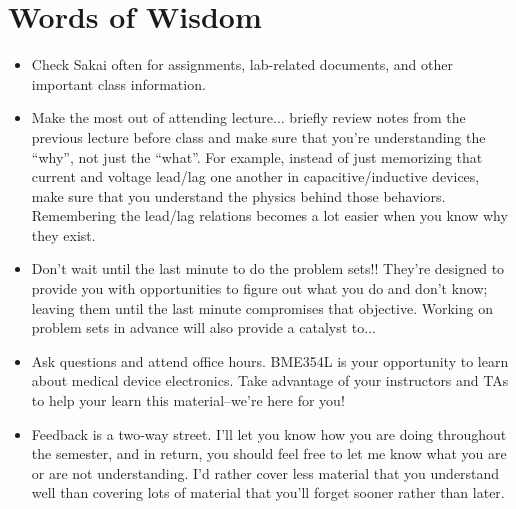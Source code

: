 \section{Words of Wisdom}
\begin{itemize}
    \item Check Sakai often for assignments, lab-related documents, and other
    important class information.
    \item Make the most out of attending lecture... briefly review notes from
    the previous lecture before class and make sure that you're understanding
    the ``why'', not just the ``what''. For example, instead of just memorizing
    that current and voltage lead/lag one another in capacitive/inductive
    devices, make sure that you understand the physics behind those behaviors.
    Remembering the lead/lag relations becomes a lot easier when you know why
    they exist.
    \item Don't wait until the last minute to do the problem sets!! They're
    designed to provide you with opportunities to figure out what you do and
    don't know; leaving them until the last minute compromises that objective.
    Working on problem sets in advance will also provide a catalyst to...
    \item Ask questions and attend office hours. BME354L is your opportunity to
    learn about medical device electronics. Take advantage of your instructors
    and TAs to help your learn this material--we're here for you!
    \item Feedback is a two-way street. I'll let you know how you are doing
    throughout the semester, and in return, you should feel free to let me know
    what you are or are not understanding. I'd rather cover less material that
    you understand well than covering lots of material that you'll forget
    sooner rather than later.
\end{itemize}
